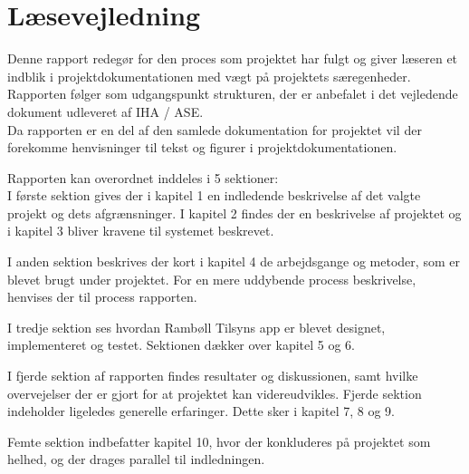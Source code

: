 \chapter*{Læsevejledning}
Denne rapport redegør for den proces som projektet har fulgt og giver læseren et indblik i projektdokumentationen med vægt på projektets særegenheder. Rapporten følger som udgangspunkt strukturen, der er anbefalet i det vejledende dokument udleveret af IHA / ASE.\\
Da rapporten er en del af den samlede dokumentation for projektet vil der forekomme
henvisninger til tekst og figurer i projektdokumentationen.


Rapporten kan overordnet inddeles i 5 sektioner:\\
I første sektion gives der i kapitel 1 en indledende beskrivelse af det valgte projekt og
dets afgrænsninger. I kapitel 2 findes der en beskrivelse af projektet og i kapitel 3 bliver
kravene til systemet beskrevet.

I anden sektion beskrives der kort i kapitel 4 de arbejdsgange og metoder, som er blevet brugt
under projektet. For en mere uddybende process beskrivelse, henvises der til process rapporten.

I tredje sektion ses hvordan Rambøll Tilsyns app er blevet designet, implementeret og testet. 
Sektionen dækker over kapitel 5 og 6.

I fjerde sektion af rapporten findes resultater og diskussionen, samt hvilke overvejelser
der er gjort for at projektet kan videreudvikles. Fjerde sektion indeholder ligeledes generelle erfaringer. Dette sker i kapitel 7, 8 og 9.

Femte sektion indbefatter kapitel 10, hvor der konkluderes på projektet som helhed, og
der drages parallel til indledningen.

